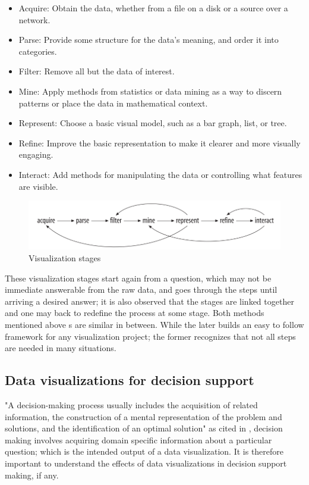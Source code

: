 \begin{displayquote}
	\begin{itemize}
\item Acquire: Obtain the data, whether from a file on a disk or a source over a network. 
\item Parse: Provide some structure for the data’s meaning, and order it into categories. 
\item Filter: Remove all but the data of interest. 
\item Mine: Apply methods from statistics or data mining as a way to discern patterns or place the data in mathematical context.
\item Represent: Choose a basic visual model, such as a bar graph, list, or tree. 
\item Refine: Improve the basic representation to make it clearer and more visually engaging. 
\item Interact: Add methods for manipulating the data or controlling what features are visible.
\end{itemize}
\end{displayquote}

\begin{figure}[!htb]
\begin{adjustbox}{width=1\textwidth,center=\textwidth}
  \centering
  \includegraphics[scale=1]{images/visualization_stages.png}
\end{adjustbox}
  \caption[Visualization stages]{Visualization stages  \cite{Cleveland1993} }
  \label{fig:data_visualization_stages}
\end{figure}
These visualization stages start again from a question, which may not be immediate answerable from the raw data, and goes through the steps until arriving a desired answer; it is also observed that the stages are linked together and one may back to redefine the process at some stage. Both methods mentioned above s are similar in between. While the later builds an easy to follow framework for any visualization project; the former recognizes that not all steps are needed in many situations.

\subsection{Data visualizations for decision support}
"A decision-making process usually includes the acquisition of related information, the construction of a mental representation of the problem and solutions, and the identification of an optimal solution" \cite{carroll1987mental} as cited in \cite{Zhu2008}, decision making involves acquiring domain specific information about a particular question; which is the intended output of a data visualization. It is therefore important to understand the effects of data visualizations in decision support making, if any.

